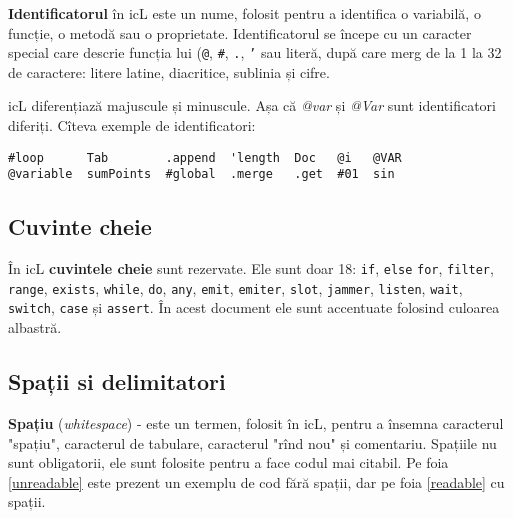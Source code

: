 \textbf{Identificatorul} în icL este un nume, folosit pentru a identifica o variabilă, o funcție, o metodă sau o proprietate. Identificatorul se începe cu un caracter special care descrie funcția lui (\texttt{@}, \texttt{#}, \texttt{.}, \texttt{'} sau literă, după care merg de la 1 la 32 de caractere: litere latine, diacritice, sublinia și cifre.

icL diferențiază majuscule și minuscule. Așa că \textit{@var} și \textit{@Var} sunt identificatori diferiți. Cîteva exemple de identificatori:

\begin{verbatim}
#loop      Tab        .append  'length  Doc   @i   @VAR
@variable  sumPoints  #global  .merge   .get  #01  sin
\end{verbatim}

\subsection{Cuvinte cheie}

În icL \textbf{cuvintele cheie} sunt rezervate. Ele sunt doar 18: \texttt{if}, \texttt{else} \texttt{for}, \texttt{filter}, \texttt{range}, \texttt{exists}, \texttt{while}, \texttt{do}, \texttt{any}, \texttt{emit}, \texttt{emiter}, \texttt{slot}, \texttt{jammer}, \texttt{listen}, \texttt{wait}, \texttt{switch}, \texttt{case} și \texttt{assert}. În acest document ele sunt accentuate folosind culoarea albastră.

\subsection{Spații si delimitatori}

\textbf{Spațiu} (\textit{whitespace}) - este un termen, folosit în icL, pentru a însemna caracterul "spațiu", caracterul de tabulare, caracterul "rînd nou" și comentariu. Spațiile nu sunt obligatorii, ele sunt folosite pentru a face codul mai citabil. Pe foia \ref{unreadable} este prezent un exemplu de cod fără spații, dar pe foia \ref{readable} cu spații.

\begin{sourcecode}
    \label{unreadable}
    \inputminted[linenos]{icl}{../sources/unreadable.icL}
\end{sourcecode}

